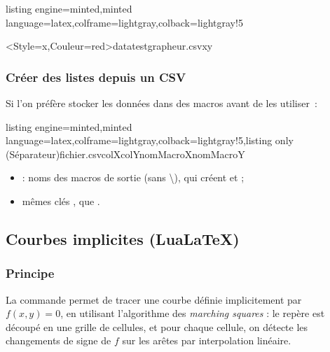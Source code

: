 \documentclass[11pt,a4paper]{ltxdoc}
\begin{document}
\begin{tcblisting}{listing engine=minted,minted language=latex,colframe=lightgray,colback=lightgray!5}
\begin{GraphiqueTikz}%
    [x=0.08cm,y=0.833cm,Xmin=0,Xmax=110,Ymin=0,Ymax=6,Xgrille=10,Xgrilles=10,Ygrilles=1]
  \TracerNuageDepuisCSV%
    [ModeTransfo=lny]%
    <Style=x,Couleur=red>{datatestgrapheur.csv}{x}{y}
\end{GraphiqueTikz}
\end{tcblisting}

\subsubsection{Créer des listes depuis un CSV}

Si l'on préfère stocker les données dans des macros avant de les utiliser~:

\begin{tcblisting}{listing engine=minted,minted language=latex,colframe=lightgray,colback=lightgray!5,listing only}
\CreerListesDepuisCSV[clés](Séparateur){fichier.csv}{colX}{colY}{nomMacroX}{nomMacroY}
\end{tcblisting}

\begin{itemize}
  \item {} : noms des macros de sortie (sans \textbackslash), qui créent  et  ;
  \item mêmes clés ,  que .
\end{itemize}

\pagebreak

\subsection{Courbes implicites (LuaLaTeX)}\label{implicit}

\subsubsection{Principe}

La commande  permet de tracer une courbe définie implicitement par $f(x,y)=0$, en utilisant l'algorithme des \textit{marching squares} : le repère est découpé en une grille de cellules, et pour chaque cellule, on détecte les changements de signe de $f$ sur les arêtes par interpolation linéaire.
\end{document}
